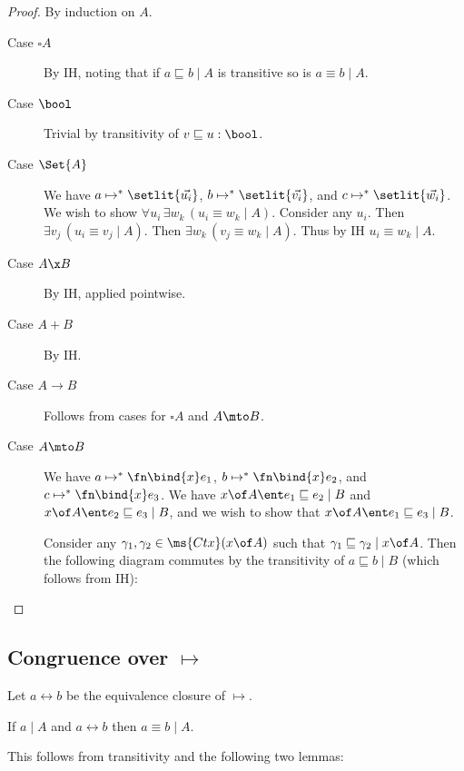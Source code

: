 \documentclass{article}
\newcommand{\ale}{\sqsubseteq}
\newcommand{\aeq}{\equiv}
\newcommand{\step}{\mapsto}
\newcommand{\steps}{\step^*}
\newcommand{\betaeq}{\leftrightarrow}
\newcommand{\disc}[1]{\square{#1}}
\newcommand{\lr}[2]{#2\mathrel{|}#1}
\newcommand{\lrcx}[3]{#1 \ent \lr{#2}{#3}}
\begin{document}
\begin{proof}
  By induction on $A$.
  \begin{description}
    \item[Case $\disc A$] By IH, noting that if $\lr{A}{a \ale b}$ is transitive
      so is $\lr{A}{a \aeq b}$.
    \item[Case $\bool$] Trivial by transitivity of $v \ale u : \bool$.
    \item[Case $\Set{A}$] We have $a \steps \setlit{\vec{u_i}}$, $b \steps
      \setlit{\vec{v_i}}$, and $c \steps \setlit{\vec{w_i}}$. We wish to show
      $\forall u_i\, \exists w_k\, (\lr{A}{u_i \aeq w_k})$. Consider any $u_i$.
      Then $\exists v_j\, (\lr{A}{u_i \aeq v_j})$. Then $\exists w_k\,
      (\lr{A}{v_j \aeq w_k})$. Thus by IH $\lr{A}{u_i \aeq w_k}$.
    \item[Case $A \x B$] By IH, applied pointwise. 
    \item[Case $A + B$] By IH. 
    \item[Case $A \to B$] Follows from cases for $\disc{A}$ and $A \mto B$.

    \item[Case $A \mto B$] We have $a \steps \fn\bind{x}e_1$, $b \steps
      \fn\bind{x}e_2$, and $c \steps \fn\bind{x}e_3$. We have $\lrcx{x \of
        A}{B}{e_1 \ale e_2}$ and $\lrcx{x \of A}{B}{e_2 \ale e_3}$, and we wish to
      show that $\lrcx{x\of A}{B}{e_1 \ale e_3}$.

      Consider any $\gamma_1, \gamma_2 \in \ms{Ctx}(x \of A)$ such that $\lr{x
        \of A}{\gamma_1 \ale \gamma_2}$. Then the following diagram commutes by
      the transitivity of $\lr{B}{a \ale b}$ (which follows from IH):
  \end{description}
\end{proof}


\subsection{Congruence over $\step$}

Let $a \betaeq b$ be the equivalence closure of $\step$.

\begin{theorem}\label{thm:congbeta}
  If $\lr{A}{a}$ and $a \betaeq b$ then $\lr{A}{a \aeq b}$.
\end{theorem}

This follows from transitivity and the following two
lemmas:
\end{document}
